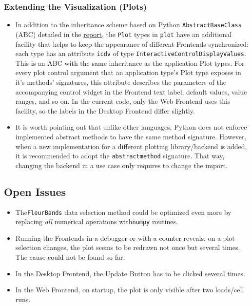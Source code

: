\subsubsection{Extending the Visualization
  (Plots)}\label{extending-the-visualization-plots}

\begin{itemize}
    \tightlist
\item
    In addition to the inheritance scheme based on Python
    \texttt{AbstractBaseClass} (ABC) detailed in the
    \href{./doc/report.pdf}{report}, the \texttt{Plot} types in
    \texttt{plot} have an additional facility that helps to keep the
    appearance of different Frontends synchronized: each type has an
    attribute \texttt{icdv} of type
    \texttt{InteractiveControlDisplayValues}. This is an ABC with the same
    inheritance as the application Plot types. For every plot control
    argument that an application type's Plot type exposes in it's methods'
    signatures, this attribute describes the parameters of the
    accompanying control widget in the Frontend text label, default
    values, value ranges, and so on. In the current code, only the Web
    Frontend uses this facility, so the labels in the Desktop Frontend
    differ slightly.\\
\item
    It is worth pointing out that unlike other languages, Python does not
    enforce implemented abstract methods to have the same method
    signature. However, when a new implementation for a different plotting
    library/backend is added, it is recommended to adopt the
    \texttt{abstractmethod} signature. That way, changing the backend in a
    use case only requires to change the import.
\end{itemize}

\subsection{Open Issues}
\label{sec:open-issues}

\begin{itemize}
\item The\texttt{FleurBands} data selection method could be optimized even more by
    replacing \textit{all} numerical operations with\texttt{numpy} routines.
\item Running the Frontends in a debugger or with a counter reveals: on a plot
    selection changes, the plot seems to be redrawn not once but several times.
    The cause could not be found so far.
\item In the Desktop Frontend, the Update Button has to be clicked several times.
\item In the Web Frontend, on startup, the plot is only visible after two loads/cell runs.   
\end{itemize}


